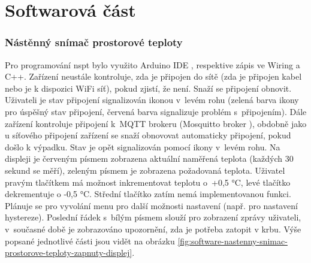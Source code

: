 \chapter{Softwarová část}

\subsection{Nástěnný snímač prostorové teploty}
Pro programování \acrshort{nspt} bylo využito Arduino IDE \cite{arduino-ide}, respektive zápis ve Wiring a C++. Zařízení neustále kontroluje, zda je připojen do sítě (zda je připojen kabel nebo je k dispozici WiFi síť), pokud zjistí, že není. Snaží se připojení obnovit. Uživateli je stav připojení signalizován ikonou v~levém rohu (zelená barva ikony pro úspěšný stav připojení, červená barva signalizuje problém s~připojením). Dále zařízení kontroluje připojení k~MQTT brokeru (Mosquitto broker \cite{mosquitto-broker}), obdobně jako u síťového připojení zařízení se snaží obnovovat automaticky připojení, pokud došlo k výpadku. Stav je opět signalizován pomocí ikony v~levém rohu. Na displeji je červeným písmem zobrazena aktuální naměřená teplota (každých 30 sekund se měří), zeleným písmem je zobrazena požadovaná teplota. Uživatel pravým tlačítkem má možnost inkrementovat teplotu o~+0,5 °C, levé tlačítko dekrementuje o -0,5 °C. Střední tlačítko zatím nemá implementovanou funkci. Plánuje se pro vyvolání menu pro další možnosti nastavení (např. pro nastavení hystereze). Poslední řádek s~bílým písmem slouží pro zobrazení zprávy uživateli, v~současné době je zobrazováno upozornění, zda je potřeba zatopit v krbu. Výše popsané jednotlivé části jsou vidět na obrázku \ref{fig:software-nastenny-snimac-prostorove-teploty-zapnuty-displej}. 

